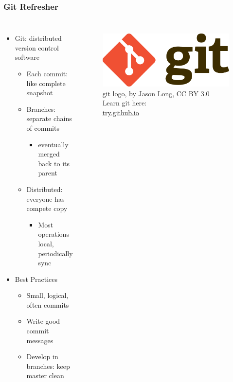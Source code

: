 \documentclass{beamer}
\begin{document}
\begin{frame}
\frametitle{Git Refresher}
\begin{columns}[t]
\begin{itemize}
  \item Git: distributed version control software
  \begin{itemize}
    \item Each commit: like complete snapshot
    \item Branches: separate chains of commits
    \begin{itemize}
      \item eventually merged back to its parent
    \end{itemize}
    \item Distributed: everyone has compete copy
    \begin{itemize}
      \item Most operations local, periodically sync
    \end{itemize}
  \end{itemize}
  \item Best Practices
  \begin{itemize}
    \item Small, logical, often commits
    \item Write good commit messages
    \item Develop in branches: keep master clean
  \end{itemize}
\end{itemize}

\begin{figure}
\centering
\includegraphics[width=1.0\columnwidth]{images-dis1/Git-Logo-2Color}
\newline
{\tiny git logo, by Jason Long, CC BY 3.0}\\
\vspace{20px}
Learn git here: \\
\url{try.github.io}

\end{figure}
\end{columns}
\end{frame}
\end{document}
